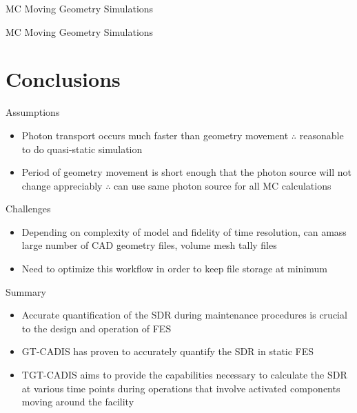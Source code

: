 \documentclass{beamer}
\begin{document}
\begin{frame}{MC Moving Geometry Simulations}
	\transduration<0-6>{0}

\end{frame}
\begin{frame}{MC Moving Geometry Simulations}
	\transduration<0-8>{0}

\end{frame}

\section{Conclusions}
\begin{frame}{Assumptions}
			\begin{itemize}
				\item{Photon transport occurs much faster than
					geometry movement $\therefore$
					reasonable to do quasi-static
					simulation}
				\item{Period of geometry movement is short
					enough that the photon source will not
					change appreciably $\therefore$ can use
					same photon source for all MC
					calculations}
			\end{itemize}
	\end{frame}
\begin{frame}{Challenges}
			\begin{itemize}
				\item{Depending on complexity of model and
					fidelity of time resolution, can amass
					large number of CAD geometry files,
					volume mesh tally files}
				\item{Need to optimize this workflow in order
					to keep file storage at minimum}
			\end{itemize}
\end{frame}

\begin{frame}{Summary}
	\begin{itemize}
		\item{Accurate quantification of the SDR during maintenance
			procedures is crucial to the design and operation of
			FES}
		\item{GT-CADIS has proven to accurately quantify the SDR in
			static FES}
		\item{TGT-CADIS aims to provide the capabilities necessary to
			calculate the SDR at various time points during
			operations that involve activated components moving
			around the facility}
	\end{itemize}
\end{frame}
\end{document}
